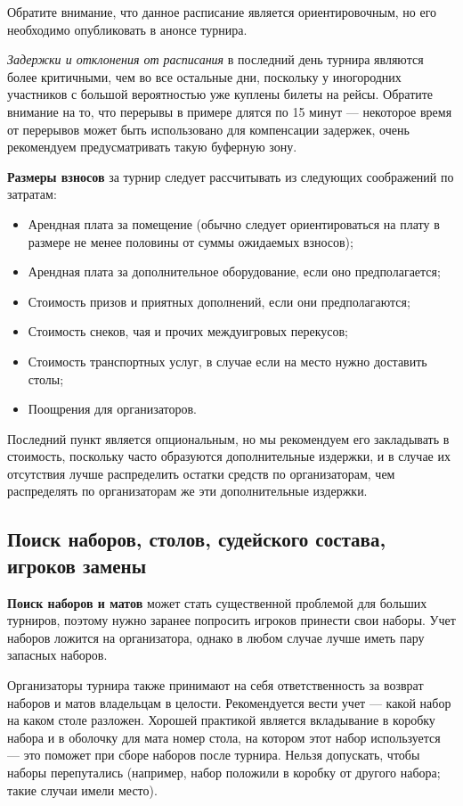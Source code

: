 Обратите внимание, что данное расписание является ориентировочным, но его необходимо опубликовать в анонсе турнира.

\textit{Задержки и отклонения от расписания} в последний день турнира являются более критичными, чем во все остальные дни, поскольку у иногородних участников с большой вероятностью уже куплены билеты на рейсы. Обратите внимание на то, что перерывы в примере длятся по 15 минут --- некоторое время от перерывов может быть использовано для компенсации задержек, очень рекомендуем предусматривать такую буферную зону.

\textbf{Размеры взносов} за турнир следует рассчитывать из следующих соображений по затратам:
\begin{itemize}
	\item Арендная плата за помещение (обычно следует ориентироваться на плату в размере не менее половины от суммы ожидаемых взносов);
	\item Арендная плата за дополнительное оборудование, если оно предполагается;
	\item Стоимость призов и приятных дополнений, если они предполагаются;
	\item Стоимость снеков, чая и прочих междуигровых перекусов;
	\item Стоимость транспортных услуг, в случае если на место нужно доставить столы;
	\item Поощрения для организаторов.
\end{itemize}

Последний пункт является опциональным, но мы рекомендуем его закладывать в стоимость, поскольку часто образуются дополнительные издержки, и в случае их отсутствия лучше распределить остатки средств по организаторам, чем распределять по организаторам же эти дополнительные издержки.

\subsection{Поиск наборов, столов, судейского состава, игроков замены}

\textbf{Поиск наборов и матов} может стать существенной проблемой для больших турниров, поэтому нужно заранее попросить игроков принести свои наборы. Учет наборов ложится на организатора, однако в любом случае лучше иметь пару запасных наборов.

Организаторы турнира также принимают на себя ответственность за возврат наборов и матов владельцам в целости. Рекомендуется вести учет --- какой набор на каком столе разложен. Хорошей практикой является вкладывание в коробку набора и в оболочку для мата номер стола, на котором этот набор используется --- это поможет при сборе наборов после турнира. Нельзя допускать, чтобы наборы перепутались (например, набор положили в коробку от другого набора; такие случаи имели место).

